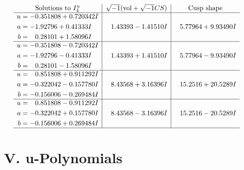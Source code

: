 \documentclass[1p]{elsarticle_modified}
\theoremstyle{definition}
\newcommand{\I}{\sqrt{-1}}
\begin{document}
$$\begin{array}{c|c|c}  
\text{Solutions to }I^u_{4}& \I (\text{vol} + \sqrt{-1}CS) & \text{Cusp shape}\\
 \hline 
\begin{aligned}
u &= -0.351808 + 0.720342 I \\
a &= -1.92796 + 0.41333 I \\
b &= \phantom{-}0.28101 + 1.58096 I\end{aligned}
 & \phantom{-}1.43393 - 1.41510 I & \phantom{-}5.77964 + 9.93490 I \\ \hline\begin{aligned}
u &= -0.351808 - 0.720342 I \\
a &= -1.92796 - 0.41333 I \\
b &= \phantom{-}0.28101 - 1.58096 I\end{aligned}
 & \phantom{-}1.43393 + 1.41510 I & \phantom{-}5.77964 - 9.93490 I \\ \hline\begin{aligned}
u &= \phantom{-}0.851808 + 0.911292 I \\
a &= -0.322042 - 0.157780 I \\
b &= -0.156006 - 0.269484 I\end{aligned}
 & \phantom{-}8.43568 + 3.16396 I & \phantom{-}15.2516 + 20.5289 I \\ \hline\begin{aligned}
u &= \phantom{-}0.851808 - 0.911292 I \\
a &= -0.322042 + 0.157780 I \\
b &= -0.156006 + 0.269484 I\end{aligned}
 & \phantom{-}8.43568 - 3.16396 I & \phantom{-}15.2516 - 20.5289 I\\
 \hline 
 \end{array}$$\newpage
\newpage\renewcommand{\arraystretch}{1}
\centering \section*{ V. u-Polynomials}
\end{document}
